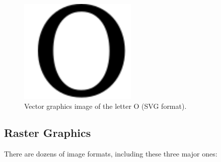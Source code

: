 \documentclass[
  12pt,
  british,
  a4paper,
  rgb,
  dvipsnames,
  svgnames,
  hyphens]{article}
\begin{document}
\begin{figure}
\hypertarget{fig:vector}{%
\centering
\includegraphics[width=0.5\textwidth,height=\textheight]{images/letter-O.svg}
\caption{Vector graphics image of the letter O (SVG
format).}\label{fig:vector}
}
\end{figure}

\hypertarget{raster-graphics}{%
\subsection{Raster Graphics}\label{raster-graphics}}

There are dozens of image formats, including these three major ones:
\end{document}
